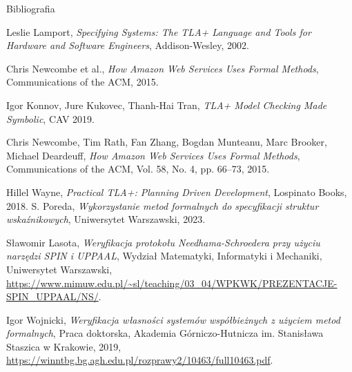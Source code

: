 \documentclass{beamer}
\begin{document}
\begin{frame}{Bibliografia}
  \scriptsize
  \begin{thebibliography}{9}
  
    Leslie Lamport, \emph{Specifying Systems: The TLA+ Language and Tools for Hardware and Software Engineers}, Addison-Wesley, 2002.
  
    Chris Newcombe et al., \emph{How Amazon Web Services Uses Formal Methods}, Communications of the ACM, 2015.
  
    Igor Konnov, Jure Kukovec, Thanh-Hai Tran, \emph{TLA+ Model Checking Made Symbolic}, CAV 2019.
    
    Chris Newcombe, Tim Rath, Fan Zhang, Bogdan Munteanu, Marc Brooker, Michael Deardeuff, \emph{How Amazon Web Services Uses Formal Methods}, Communications of the ACM, Vol. 58, No. 4, pp. 66--73, 2015.


    Hillel Wayne, \emph{Practical TLA+: Planning Driven Development}, Lospinato Books, 2018.
    S. Poreda,
    \textit{Wykorzystanie metod formalnych do specyfikacji struktur wskaźnikowych},
    Uniwersytet Warszawski, 2023.

    Sławomir Lasota,
    \textit{Weryfikacja protokołu Needhama-Schroedera przy użyciu narzędzi SPIN i UPPAAL},
    Wydział Matematyki, Informatyki i Mechaniki, Uniwersytet Warszawski,
    \url{https://www.mimuw.edu.pl/~sl/teaching/03_04/WPKWK/PREZENTACJE-SPIN_UPPAAL/NS/}.

    Igor Wojnicki,
    \textit{Weryfikacja własności systemów współbieżnych z użyciem metod formalnych},
    Praca doktorska, Akademia Górniczo-Hutnicza im. Stanisława Staszica w Krakowie, 2019,
    \url{https://winntbg.bg.agh.edu.pl/rozprawy2/10463/full10463.pdf}.
        
  \end{thebibliography}
\end{frame}
\end{document}
